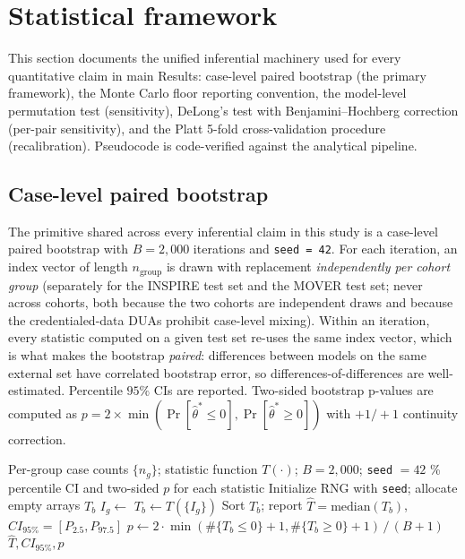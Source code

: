 \documentclass[11pt,a4paper]{article}
\begin{document}
\section{Statistical framework}\label{supp:s3-inferential}

This section documents the unified inferential machinery used for every
quantitative claim in main Results: case-level paired bootstrap (the primary
framework), the Monte Carlo floor reporting convention, the model-level
permutation test (sensitivity), DeLong's test with Benjamini--Hochberg
correction (per-pair sensitivity), and the Platt 5-fold cross-validation
procedure (recalibration). Pseudocode is code-verified against the
analytical pipeline.

\subsection{Case-level paired bootstrap}\label{supp:s3-bootstrap}

The primitive shared across every inferential claim in this study is a
case-level paired bootstrap with $B = 2{,}000$ iterations and \texttt{seed = 42}.
For each iteration, an index vector of length $n_{\text{group}}$ is drawn
with replacement \emph{independently per cohort group} (separately for the
INSPIRE test set and the MOVER test set; never across cohorts, both because
the two cohorts are independent draws and because the credentialed-data DUAs
prohibit case-level mixing). Within an iteration, every statistic computed on
a given test set re-uses the same index vector, which is what makes the
bootstrap \emph{paired}: differences between models on the same external set
have correlated bootstrap error, so differences-of-differences are
well-estimated. Percentile $95\%$ CIs are reported. Two-sided bootstrap
p-values are computed as $p = 2 \times \min(\Pr[\hat{\theta}^* \le 0],
\Pr[\hat{\theta}^* \ge 0])$ with $+1/+1$ continuity correction.

\begin{algorithm}[H]
\caption{Case-level paired bootstrap (per cohort).}
\label{alg:paired-bootstrap}
\begin{algorithmic}[1]
\Require Per-group case counts $\{n_g\}$; statistic function $T(\cdot)$;
$B = 2{,}000$; \texttt{seed} $= 42$
\% percentile CI and two-sided $p$ for each statistic
\State Initialize RNG with \texttt{seed}; allocate empty arrays $T_b$
    \State $I_g \gets$  
  \EndFor
  \State $T_b \gets T(\{I_g\})$ 
\EndFor
\State Sort $T_b$; report $\widehat T = \text{median}(T_b)$, $CI_{95\%} = [P_{2.5}, P_{97.5}]$
\State $p \gets 2 \cdot \min(\#\{T_b \le 0\}+1, \#\{T_b \ge 0\}+1)\,/\,(B+1)$
\State \Return $\widehat T, CI_{95\%}, p$
\end{algorithmic}
\end{algorithm}
\end{document}
